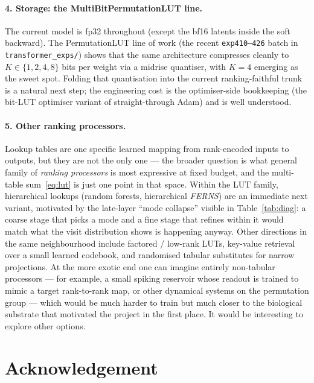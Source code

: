 \documentclass[11pt]{article}
\begin{document}
\paragraph{4. Storage: the MultiBitPermutationLUT line.}
The current model is fp32 throughout (except the bf16 latents inside the soft backward).
The PermutationLUT line of work (the recent \texttt{exp410--426} batch in \texttt{transformer\_exps/}) shows that the same architecture compresses cleanly to $K \in \{1, 2, 4, 8\}$ bits per weight via a midrise quantiser, with $K=4$ emerging as the sweet spot.
Folding that quantisation into the current ranking-faithful trunk is a natural next step; the engineering cost is the optimiser-side bookkeeping (the bit-LUT optimiser variant of straight-through Adam) and is well understood.

\paragraph{5. Other ranking processors.}
Lookup tables are one specific learned mapping from rank-encoded inputs to outputs, but they are not the only one --- the broader question is what general family of \emph{ranking processors} is most expressive at fixed budget, and the multi-table sum~\eqref{eq:lut} is just one point in that space.
Within the LUT family, hierarchical lookups (random forests, hierarchical \emph{FERNS}) are an immediate next variant, motivated by the late-layer ``mode collapse'' visible in Table~\ref{tab:diag}: a coarse stage that picks a mode and a fine stage that refines within it would match what the visit distribution shows is happening anyway.
Other directions in the same neighbourhood include factored / low-rank LUTs, key-value retrieval over a small learned codebook, and randomised tabular substitutes for narrow projections.
At the more exotic end one can imagine entirely non-tabular processors --- for example, a small spiking reservoir whose readout is trained to mimic a target rank-to-rank map, or other dynamical systems on the permutation group --- which would be much harder to train but much closer to the biological substrate that motivated the project in the first place.
It would be interesting to explore other options.


\section*{Acknowledgement}
\end{document}
